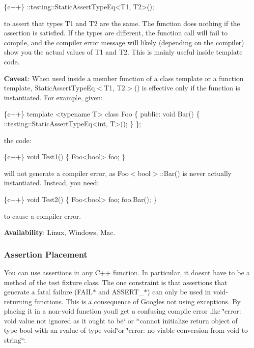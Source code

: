 \begin{DoxyCode}
\{c++\}
::testing::StaticAssertTypeEq<T1, T2>();
\end{DoxyCode}


to assert that types {\ttfamily T1} and {\ttfamily T2} are the same. The function does nothing if the assertion is satisfied. If the types are different, the function call will fail to compile, and the compiler error message will likely (depending on the compiler) show you the actual values of {\ttfamily T1} and {\ttfamily T2}. This is mainly useful inside template code.

{\bfseries Caveat}\+: When used inside a member function of a class template or a function template, {\ttfamily Static\+Assert\+Type\+Eq$<$T1, T2$>$()} is effective only if the function is instantiated. For example, given\+:


\begin{DoxyCode}
\{c++\}
template <typename T> class Foo \{
 public:
  void Bar() \{ ::testing::StaticAssertTypeEq<int, T>(); \}
\};
\end{DoxyCode}


the code\+:


\begin{DoxyCode}
\{c++\}
void Test1() \{ Foo<bool> foo; \}
\end{DoxyCode}


will not generate a compiler error, as {\ttfamily Foo$<$bool$>$\+::\+Bar()} is never actually instantiated. Instead, you need\+:


\begin{DoxyCode}
\{c++\}
void Test2() \{ Foo<bool> foo; foo.Bar(); \}
\end{DoxyCode}


to cause a compiler error.

{\bfseries Availability}\+: Linux, Windows, Mac.

\subsubsection*{Assertion Placement}

You can use assertions in any C++ function. In particular, it doesn\textquotesingle{}t have to be a method of the test fixture class. The one constraint is that assertions that generate a fatal failure ({\ttfamily F\+A\+I\+L$\ast$} and {\ttfamily A\+S\+S\+E\+R\+T\+\_\+$\ast$}) can only be used in void-\/returning functions. This is a consequence of Google\textquotesingle{}s not using exceptions. By placing it in a non-\/void function you\textquotesingle{}ll get a confusing compile error like {\ttfamily \char`\"{}error\+: void value not ignored as it ought to be\char`\"{}} or `\char`\"{}cannot
initialize return object of type \textquotesingle{}bool\textquotesingle{} with an rvalue of type \textquotesingle{}void\textquotesingle{}\char`\"{}{\ttfamily or }\char`\"{}error\+: no viable conversion from \textquotesingle{}void\textquotesingle{} to \textquotesingle{}string\textquotesingle{}\char`\"{}`.

